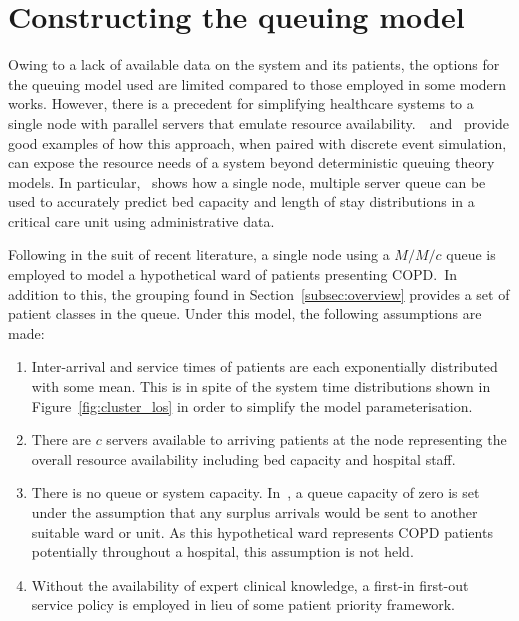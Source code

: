\section{Constructing the queuing model}\label{sec:model}

Owing to a lack of available data on the system and its patients, the options
for the queuing model used are limited compared to those employed in some modern
works. However, there is a precedent for simplifying healthcare systems to a
single node with parallel servers that emulate resource
availability.~\cite{Steins2013}~and~\cite{Williams2015} provide good examples of
how this approach, when paired with discrete event simulation, can expose the
resource needs of a system beyond deterministic queuing theory models. In
particular,~\cite{Williams2015} shows how a single node, multiple server queue
can be used to accurately predict bed capacity and length of stay distributions
in a critical care unit using administrative data.

Following in the suit of recent literature, a single node using a \(M/M/c\)
queue is employed to model a hypothetical ward of patients presenting COPD.\ In
addition to this, the grouping found in Section~\ref{subsec:overview} provides
a set of patient classes in the queue. Under this model, the following
assumptions are made:
\begin{enumerate}
    \item Inter-arrival and service times of patients are each exponentially
        distributed with some mean. This is in spite of the system time
        distributions shown in Figure~\ref{fig:cluster_los} in order to
        simplify the model parameterisation.
    \item There are \(c\) servers available to arriving patients at the node
        representing the overall resource availability including bed capacity
        and hospital staff.
    \item There is no queue or system capacity. In~\cite{Williams2015}, a
        queue capacity of zero is set under the assumption that any surplus
        arrivals would be sent to another suitable ward or unit. As this
        hypothetical ward represents COPD patients potentially throughout a
        hospital, this assumption is not held.
    \item Without the availability of expert clinical knowledge, a first-in
        first-out service policy is employed in lieu of some patient priority 
        framework.
\end{enumerate}

